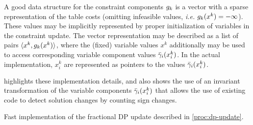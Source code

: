A good data structure for the constraint components \(g_k\) is a vector with a sparse representation of the table costs (omitting infeasible values, \emph{i.e.} \(g_k(x^k) = -\infty\)).
These values may be implicitly represented by proper initialization of variables in the constraint update.
The vector representation may be described as a list of pairs \(\langle x^k, g_k(x^k)\rangle\), where the (fixed) variable values \(x^k\) additionally may be used to access corresponding variable component values \(\bar{\gamma}_i(x^k_i)\).
In the actual implementation, \(x^k_i\) are represented as pointers to the values \(\bar{\gamma}_i(x^k_i)\).

 highlights these implementation details, and also shows the use of an invariant transformation of the variable components \(\bar{\gamma}_i(x^k_i)\) that allows the use of existing code to detect solution changes by counting sign changes.

\begin{algorithm}[tbp]
	
	\caption{
		Fast implementation of the fractional DP update described in \cref{proc:dp-update}.
	}
	\label{proc:frac-dp-update-fast}
\end{algorithm}

